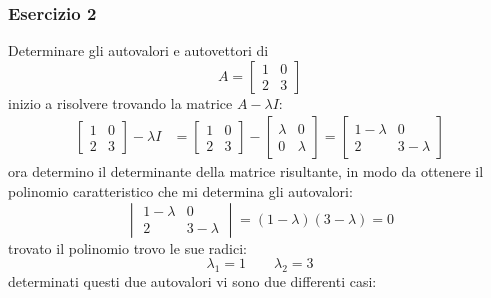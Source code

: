 \documentclass[italian]{article}
\begin{document}
\subsubsection{Esercizio 2}
Determinare gli autovalori e autovettori di
\[
	A = 
	\begin{bmatrix}
		1 & 0 \\ 2 & 3
	\end{bmatrix}
\]
inizio a risolvere trovando la matrice $A - \lambda I$:
\[
\begin{split}
	\begin{bmatrix}1 & 0 \\ 2 & 3\end{bmatrix} - \lambda I &=
	\begin{bmatrix}1 & 0 \\ 2 & 3\end{bmatrix} - \begin{bmatrix}\lambda & 0 \\ 0 & \lambda\end{bmatrix}
	=
	\begin{bmatrix}1-\lambda & 0 \\ 2 & 3-\lambda\end{bmatrix}
\end{split}
\]
ora determino il determinante della matrice risultante, in modo da ottenere il polinomio caratteristico che mi determina gli autovalori:
\[
	\begin{vmatrix}1-\lambda & 0 \\ 2 & 3-\lambda\end{vmatrix} = (1-\lambda)(3-\lambda) = 0
\]
trovato il polinomio trovo le sue radici:
\[
	\lambda_1 = 1 \qquad \lambda_2=3
\]
determinati questi due autovalori vi sono due differenti casi:
\end{document}
